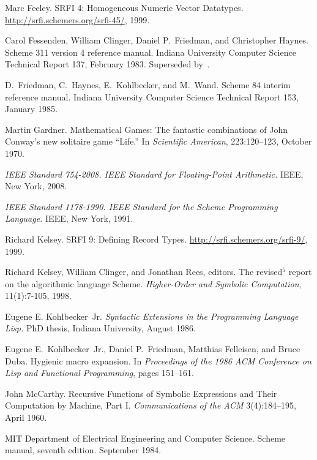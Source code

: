 \begin{thebibliography}{999}
Marc Feeley.
SRFI 4: Homogeneous Numeric Vector Datatypes.
\url{http://srfi.schemers.org/srfi-45/}, 1999.

Carol Fessenden, William Clinger, Daniel P.~Friedman, and Christopher Haynes.
Scheme 311 version 4 reference manual.
Indiana University Computer Science Technical Report 137, February 1983.
Superseded by~\cite{Scheme84}.

D.~Friedman, C.~Haynes, E.~Kohlbecker, and M.~Wand.
Scheme 84 interim reference manual.
Indiana University Computer Science Technical Report 153, January 1985.

Martin Gardner.
Mathematical Games: The fantastic combinations of John Conway's new solitaire game ``Life.''
In {\em Scientific American}, 223:120--123, October 1970.

{\em IEEE Standard 754-2008.  IEEE Standard for Floating-Point
Arithmetic.}  IEEE, New York, 2008.

{\em IEEE Standard 1178-1990.  IEEE Standard for the Scheme
  Programming Language.}  IEEE, New York, 1991.

Richard Kelsey.
SRFI 9: Defining Record Types.
\url{http://srfi.schemers.org/srfi-9/}, 1999.

Richard Kelsey, William Clinger, and Jonathan Rees, editors.
The revised$^5$ report on the algorithmic language Scheme.
{\em Higher-Order and Symbolic Computation}, 11(1):7-105, 1998.

Eugene E. Kohlbecker~Jr.
{\em Syntactic Extensions in the Programming Language Lisp.}
PhD thesis, Indiana University, August 1986.

Eugene E.~Kohlbecker~Jr., Daniel P.~Friedman, Matthias Felleisen, and Bruce Duba.
Hygienic macro expansion.
In {\em Proceedings of the 1986 ACM Conference on Lisp
  and Functional Programming}, pages 151--161.

John McCarthy.
Recursive Functions of Symbolic Expressions and Their Computation by Machine, Part I.
{\em Communications of the ACM} 3(4):184--195, April 1960.

MIT Department of Electrical Engineering and Computer Science.
Scheme manual, seventh edition.
September 1984.


\end{thebibliography}
